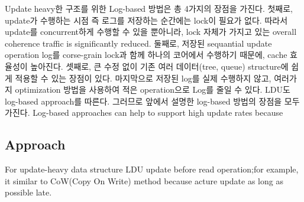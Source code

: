 \fi


%
\ifkor
Update heavy한 구조를 위한 Log-based 방법은 총 4가지의 장점을 가진다. 
첫째로, update가 수행하는 시점 즉 로그를 저장하는 순간에는 lock이 필요가 없다. 
따라서 update를 concurrent하게 수행할 수 있을 뿐아니라, lock 자체가 가지고 있는 overall
coherence traffic is significantly reduced.
둘째로, 저장된 sequantial update operation log를 corse-grain lock과 함께 하나의 코어에서 수행하기
때문에, cache 효율성이 높아진다.
셋째로, 큰 수정 없이 기존 여러 데이터(tree, queue) structure에 쉽게 적용할 수 있는 장점이 있다.
마지막으로 저장된 log를 실제 수행하지 않고, 여러가지 optimization 방법을 사용하여 적은 operation으로 Log를 줄일 수
있다. 
LDU도 log-based approach를 따른다. 그러므로 앞에서 설명한 log-based 방법의 장점을 모두 가진다.
\else
Log-based approaches can help to support high update rates because
\fi



\subsection{Approach}


\ifkor
\else
For update-heavy data structure LDU update before read operation;for example, it
similar to CoW(Copy On Write) method because acture update as long as possible
late.
\fi


